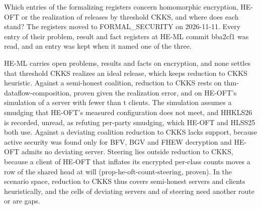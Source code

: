 \documentclass{labreport}
\begin{document}
\lrmaketitle

\lrscope

Which entries of the formalizing registers concern homomorphic encryption, HE-OFT or the realization of releases by threshold CKKS, and where does each stand? The registers moved to FORMAL\_SECURITY on 2026-11-11. Every entry of their problem, result and fact registers at HE-ML commit bba2cf1 was read, and an entry was kept when it named one of the three.

\lrresult

HE-ML carries  open problems,  results and  facts on encryption, and none settles that threshold CKKS realizes an ideal release, which keeps reduction to CKKS heuristic.
Against a semi-honest coalition, reduction to CKKS rests on thm-dataflow-composition, proven given the realization error, and on HE-OFT's simulation of a server with fewer than t clients.
The simulation assumes a smudging that HE-OFT's measured configuration does not meet, and HHKLS26 is recorded, unread, as refuting per-party smudging, which HE-OFT and HLSS25 both use.
Against a deviating coalition reduction to CKKS lacks support, because active security was found only for BFV, BGV and FHEW decryption and HE-OFT admits no deviating server.
Steering lies outside reduction to CKKS, because a client of HE-OFT that inflates its encrypted per-class counts moves a row of the shared head at will (prop-he-oft-count-steering, proven).
In the scenario space, reduction to CKKS thus covers semi-honest servers and clients heuristically, and the cells of deviating servers and of steering need another route or are gaps.

\end{document}
